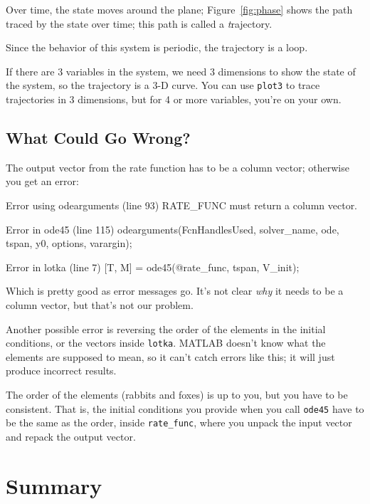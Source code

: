 Over time, the state moves around the plane; Figure~\ref{fig:phase} shows
the path traced by the state over time; this path
is called a {\emph trajectory}.

Since the behavior of this system is periodic, the trajectory is a loop.

If there are 3 variables in the system, we need 3 dimensions to show
the state of the system, so the trajectory is a 3-D curve.
You can use {\tt plot3} to trace trajectories in 3 dimensions,
but for 4 or more variables, you're on your own.



\subsection{What Could Go Wrong?}

The output vector from the rate function has to be a column vector; otherwise you get an error:

\begin{code}
Error using odearguments (line 93)
RATE_FUNC must return a column vector.

Error in ode45 (line 115)
  odearguments(FcnHandlesUsed, solver_name, ode, tspan, y0, 
               options, varargin);

Error in lotka (line 7)
    [T, M] = ode45(@rate_func, tspan, V_init);
\end{code}

Which is pretty good as error messages go.  It's not clear {\em why}
it needs to be a column vector, but that's not our problem.


Another possible error is reversing the order of the elements in the
initial conditions, or the vectors inside {\tt lotka}.  MATLAB
doesn't know what the elements are supposed to mean, so it can't catch
errors like this; it will just produce incorrect results.

The order of the elements (rabbits and foxes) is up to you, but
you have to be consistent.  That is, the initial conditions you
provide when you call {\tt ode45} have to be the same as the order,
inside \verb"rate_func", where you unpack the input vector and repack
the output vector.

\section{Summary}

